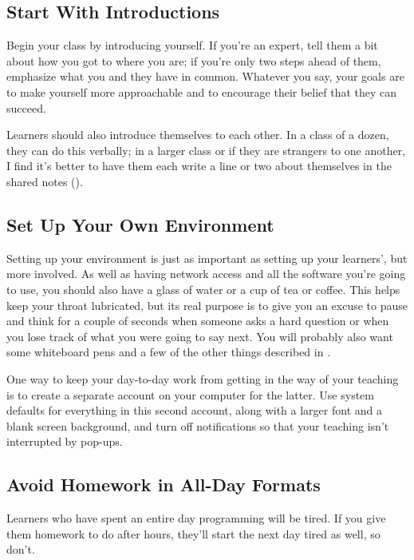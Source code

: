 \subsection*{Start With Introductions}

Begin your class by introducing yourself.
If you're an expert,
tell them a bit about how you got to where you are;
if you're only two steps ahead of them,
emphasize what you and they have in common.
Whatever you say,
your goals are to make yourself more approachable
and to encourage their belief that they can succeed.

Learners should also introduce themselves to each other.
In a class of a dozen,
they can do this verbally;
in a larger class or if they are strangers to one another,
I find it's better to have them each write a line or two about themselves
in the shared notes ().

\subsection*{Set Up Your Own Environment}

Setting up your environment is just as important as setting up your learners',
but more involved.
As well as having network access and all the software you're going to use,
you should also have a glass of water
or a cup of tea or coffee.
This helps keep your throat lubricated,
but its real purpose is to give you an excuse to pause and think for a couple of seconds
when someone asks a hard question
or when you lose track of what you were going to say next.
You will probably also want some whiteboard pens
and a few of the other things described in .

One way to keep your day-to-day work from getting in the way of your teaching
is to create a separate account on your computer for the latter.
Use system defaults for everything in this second account,
along with a larger font and a blank screen background,
and turn off notifications so that your teaching isn't interrupted by pop-ups.

\subsection*{Avoid Homework in All-Day Formats}

Learners who have spent an entire day programming will be tired.
If you give them homework to do after hours,
they'll start the next day tired as well,
so don't.

